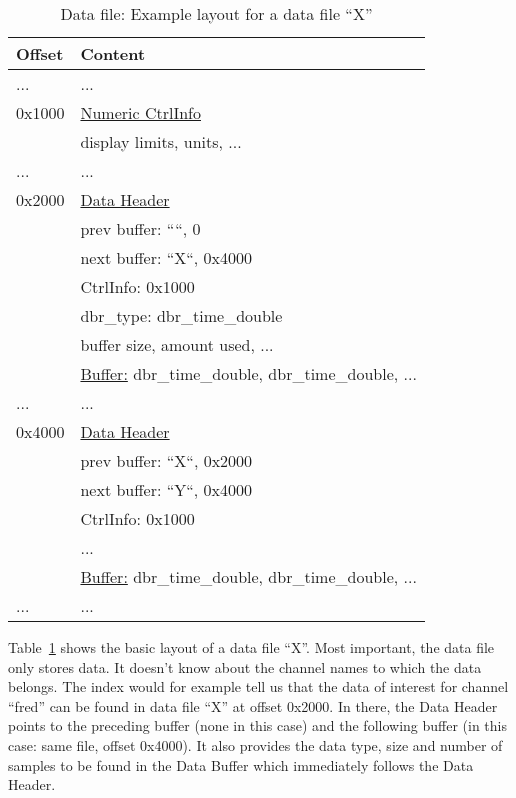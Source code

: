 \begin{table}[htbp]
  \begin{center}
    \begin{tabular}{ll}
     Offset  & Content \\
     \hline
     ...     & ... \\
     0x1000  & \underline{Numeric CtrlInfo} \\
             & display limits, units, ... \\
     ...     & ... \\
     0x2000  & \underline{Data Header} \\
             & prev buffer: ````, 0 \\
             & next buffer: ``X``, 0x4000 \\
             & CtrlInfo: 0x1000 \\ 
             & dbr\_type: dbr\_time\_double \\
             & buffer size, amount used, ... \\
             & \underline{Buffer:} dbr\_time\_double, dbr\_time\_double, ... \\
     ...     & ... \\
     0x4000  & \underline{Data Header} \\
             & prev buffer: ``X``, 0x2000 \\
             & next buffer: ``Y``, 0x4000 \\
             & CtrlInfo: 0x1000 \\ 
             & ... \\
             & \underline{Buffer:} dbr\_time\_double, dbr\_time\_double, ... \\
     ...     & ... \\  
    \end{tabular}
    \caption{Data file: Example layout for a data file ``X''}
    \label{tab:datafile}
  \end{center}
\end{table}

\noindent Table~\ref{tab:datafile} shows the basic layout of a data file ``X''.
Most important, the data file only stores data. It doesn't know about
the channel names to which the data belongs. The index would for
example tell us that the data of interest for channel ``fred'' can be
found in data file ``X'' at offset 0x2000. In there, the Data Header
points to the preceding buffer (none in this case) and the following
buffer (in this case: same file, offset 0x4000). It also provides the
data type, size and number of samples to be found in the Data Buffer
which immediately follows the Data Header. 

